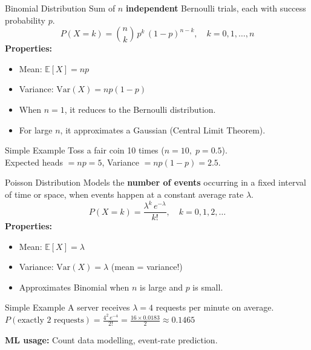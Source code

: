 \begin{frame}{Binomial Distribution}
Sum of $n$ \textbf{independent} Bernoulli trials, each with success probability $p$.
\[
P(X = k) = \binom{n}{k}\, p^k\, (1-p)^{n-k}, \quad k = 0, 1, \dots, n
\]
\textbf{Properties:}
\begin{itemize}
    \item Mean: $\mathbb{E}[X] = np$
    \item Variance: $\mathrm{Var}(X) = np(1-p)$
    \item When $n=1$, it reduces to the Bernoulli distribution.
    \item For large $n$, it approximates a Gaussian (Central Limit Theorem).
\end{itemize}
\begin{exampleblock}{Simple Example}
Toss a fair coin 10 times ($n=10,\; p=0.5$).\\
Expected heads $= np = 5$, \quad Variance $= np(1-p) = 2.5$.
\end{exampleblock}
\end{frame}

\begin{frame}{Poisson Distribution}
Models the \textbf{number of events} occurring in a fixed interval of time or space, when events happen at a constant average rate $\lambda$.
\[
P(X = k) = \frac{\lambda^k\, e^{-\lambda}}{k!}, \quad k = 0, 1, 2, \dots
\]
\textbf{Properties:}
\begin{itemize}
    \item Mean: $\mathbb{E}[X] = \lambda$
    \item Variance: $\mathrm{Var}(X) = \lambda$ \quad (mean = variance!)
    \item Approximates Binomial when $n$ is large and $p$ is small.
\end{itemize}
\begin{exampleblock}{Simple Example}
A server receives $\lambda = 4$ requests per minute on average.\\
$P(\text{exactly 2 requests}) = \frac{4^2\, e^{-4}}{2!} = \frac{16 \times 0.0183}{2} \approx 0.1465$
\end{exampleblock}
\textbf{ML usage:} Count data modelling, event-rate prediction.
\end{frame}

